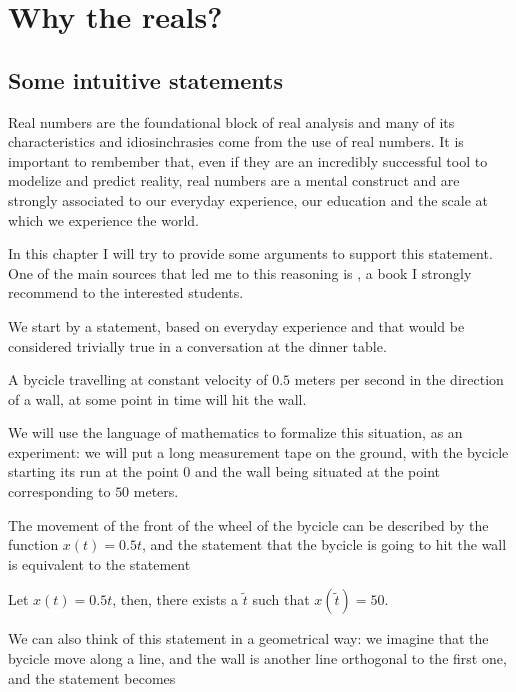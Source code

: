 \chapter{Why the reals?}

\section{Some intuitive statements}
Real numbers are the foundational block of real analysis and many of its characteristics and idiosinchrasies
come from the use of real numbers.
It is important to rembember that, even if they are an incredibly successful tool to modelize and predict 
reality, real numbers are a mental construct and are strongly associated to our everyday experience, our education
and the scale at which we experience the world.

In this chapter I will try to provide some arguments to support this statement. One of the main sources
that led me to this reasoning is \cite{Koerner2004}, a book I strongly recommend to the interested students.

We start by a statement, based on everyday experience and that would be considered trivially true in 
a conversation at the dinner table.

\begin{statement}
A bycicle travelling at constant velocity of $0.5$ meters per second in the direction of a wall,
at some point in time will hit the wall.
\end{statement}

We will use the language of mathematics to formalize this situation, as an experiment: we will put 
a long measurement tape on the ground, with the bycicle starting its run at the point $0$
and the wall being situated at the point corresponding to $50$ meters.

The movement of the front of the wheel of the bycicle can be described by the function 
$x(t) = 0.5 t$, and the statement that the bycicle is going to hit the wall is equivalent 
to the statement

\begin{statement}\label{st:eq}
Let $x(t) = 0.5 t$, then, there exists a $\tilde{t}$ such that $x(\tilde{t})=50$.  
\end{statement}

We can also think of this statement in a geometrical way: we imagine that the bycicle move along 
a line, and the wall is another line orthogonal to the first one, and the statement becomes

